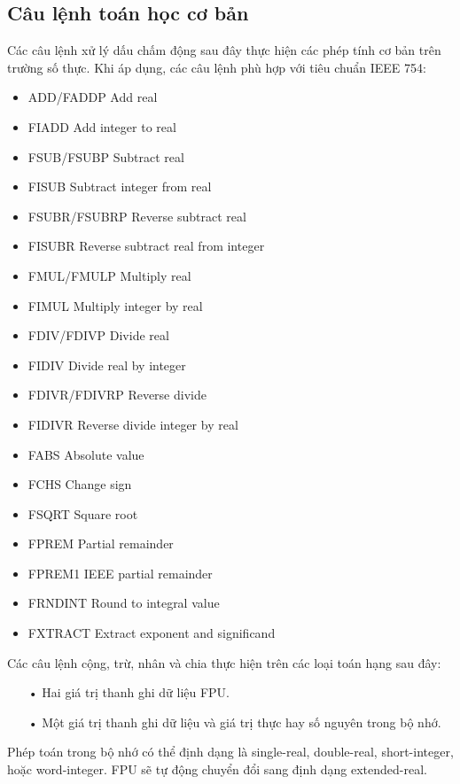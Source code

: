 		\subsection*{Câu lệnh toán học cơ bản}
		Các câu lệnh xử lý dấu chấm động sau đây thực hiện các phép tính cơ bản trên trường số thực. Khi áp dụng, các câu lệnh phù hợp với tiêu chuẩn IEEE 754:
		\begin{itemize}
			\renewcommand{\labelitemi}{}
			\item	 ADD/FADDP Add real
			\item	FIADD Add integer to real
			\item	FSUB/FSUBP Subtract real
			\item	FISUB Subtract integer from real
			\item	FSUBR/FSUBRP Reverse subtract real
			\item	FISUBR Reverse subtract real from integer
			\item	FMUL/FMULP Multiply real
			\item	FIMUL Multiply integer by real
			\item	FDIV/FDIVP Divide real
			\item	FIDIV Divide real by integer
			\item	FDIVR/FDIVRP Reverse divide
			\item	FIDIVR Reverse divide integer by real
			\item	FABS Absolute value
			\item	FCHS Change sign
			\item	FSQRT Square root
			\item	FPREM Partial remainder
			\item	FPREM1 IEEE partial remainder
			\item	FRNDINT Round to integral value
			\item	FXTRACT Extract exponent and significand
		\end{itemize}

	Các câu lệnh cộng, trừ, nhân và chia thực hiện trên các loại toán hạng sau đây:
		\begin{itemize}
			\item[•]	Hai giá trị thanh ghi dữ liệu FPU.
			\item[•]   Một giá trị thanh ghi dữ liệu và giá trị thực hay số nguyên trong bộ nhớ.
		\end{itemize}
 
		Phép toán trong bộ nhớ có thể định dạng là single-real, double-real, short-integer, hoặc word-integer. FPU sẽ tự động chuyển đổi sang định dạng extended-real. \\
		
